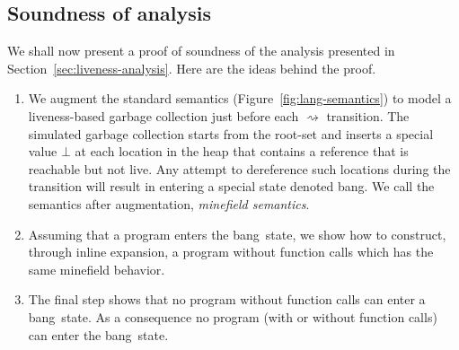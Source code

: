 \documentclass[preprint, 9pt]{sigplanconf}
\newcommand{\bang}{\mbox{\sc bang}}
\begin{document}

\subsection{Soundness of analysis}  

We shall now present a proof of soundness of the analysis presented in
Section~\ref{sec:liveness-analysis}.   Here are  the ideas  behind the
proof.
\begin{enumerate}
\item       We   augment     the        standard       semantics
  (Figure~\ref{fig:lang-semantics}) to model  a liveness-based garbage
  collection  just  before  each  $\rightsquigarrow$  transition.  The
  simulated garbage collection starts from  the root-set and inserts a
  special value  $\bot$ at each location  in the heap that  contains a
  reference that is reachable but not live. Any attempt to dereference
  such  locations during  the  transition will  result  in entering  a
  special state denoted \bang. We call the semantics after
  augmentation,  \emph{minefield semantics}.
\item \label{inline1} Assuming that a  program enters the \bang\ state,
  we  show  how to  construct,  through  inline expansion,  a  program
  without function calls which has the same minefield behavior.
\item  The final  step   shows  that  no program  without
  function calls can enter a \bang\ state. As a consequence no program
  (with or without function calls) can enter the \bang\ state. 
\end{enumerate}
\end{document}
